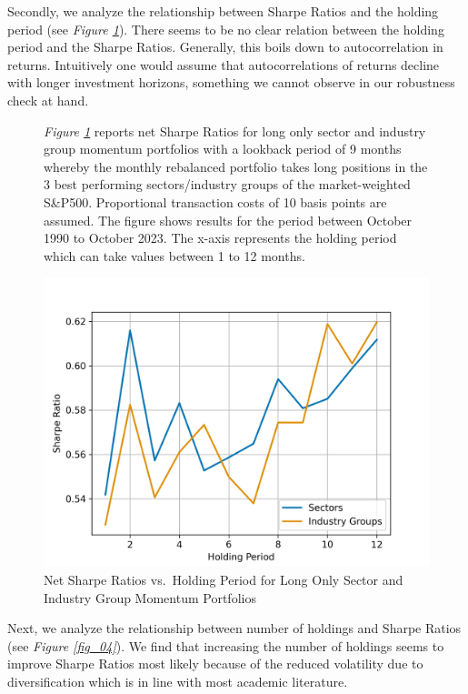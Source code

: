 \documentclass[a4paper,12pt,twoside]{article}
\begin{document}
\newpage
Secondly, we analyze the relationship between Sharpe Ratios and the holding period (see \textit{Figure \ref{fig_05}}). There seems to be no clear relation between the holding period and the Sharpe Ratios. Generally, this boils down to autocorrelation in returns. Intuitively one would assume that autocorrelations of returns decline with longer investment horizons, something we cannot observe in our robustness check at hand.

\begin{figure}[H]
       \captionsetup{justification=centering}
   \caption{Net Sharpe Ratios vs.~Holding Period for Long Only Sector and Industry Group Momentum Portfolios}
    \label{fig_05}
        \textit{Figure \ref{fig_05}} reports net Sharpe Ratios for long only sector and industry group momentum portfolios with a lookback period of 9 months whereby the monthly rebalanced portfolio takes long positions in the 3 best performing sectors/industry groups of the market-weighted S\&P500. Proportional transaction costs of 10 basis points are assumed. The figure shows results for the period between October 1990 to October 2023. The x-axis represents the holding period which can take values between 1 to 12 months.
    \centerline{\includegraphics[width=1\textwidth]{Plots/robustness_check_holdingperiod.png}}
\end{figure}

\newpage
Next, we analyze the relationship between number of holdings and Sharpe Ratios (see \textit{Figure \ref{fig_04}}). We find that increasing the number of holdings seems to improve Sharpe Ratios most likely because of the reduced volatility due to diversification which is in line with most academic literature.\\
\end{document}
